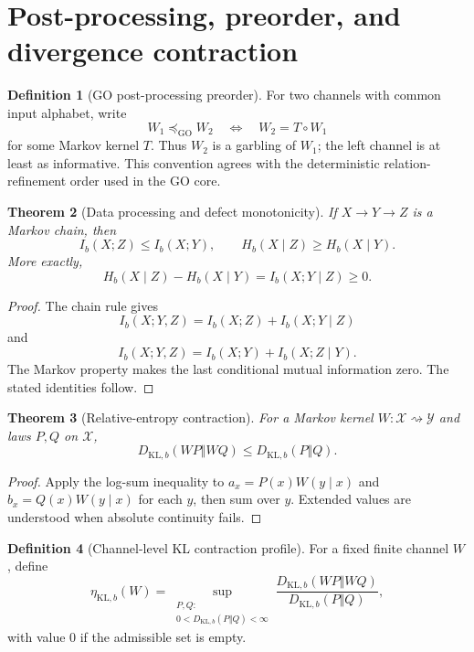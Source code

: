 \documentclass[11pt,a4paper]{article}
\theoremstyle{definition}
\newtheorem{definition}{Definition}[section]
\theoremstyle{plain}
\newtheorem{theorem}[definition]{Theorem}
\theoremstyle{remark}
\newcommand{\X}{\mathcal{X}}
\newcommand{\Y}{\mathcal{Y}}
\newcommand{\1}{\mathbf{1}}
\newcommand{\KLb}{D_{\mathrm{KL},b}}
\newcommand{\Hb}{H_b}
\newcommand{\Ib}{I_b}
\begin{document}
\section{Post-processing, preorder, and divergence contraction}

\begin{definition}[GO post-processing preorder]
For two channels with common input alphabet, write
\[
W_1\preceq_{\mathrm{GO}}W_2
\quad\Longleftrightarrow\quad
W_2=T\circ W_1
\]
for some Markov kernel $T$. Thus $W_2$ is a garbling of $W_1$; the left
channel is at least as informative. This convention agrees with the
deterministic relation-refinement order used in the GO core.
\end{definition}

\begin{theorem}[Data processing and defect monotonicity]
\label{thm:dpi}
If $X\to Y\to Z$ is a Markov chain, then
\[
\Ib(X;Z)\leq\Ib(X;Y),
\qquad
\Hb(X\mid Z)\geq\Hb(X\mid Y).
\]
More exactly,
\[
\Hb(X\mid Z)-\Hb(X\mid Y)=\Ib(X;Y\mid Z)\geq0.
\]
\end{theorem}

\begin{proof}
The chain rule gives
\[
\Ib(X;Y,Z)=\Ib(X;Z)+\Ib(X;Y\mid Z)
\]
and
\[
\Ib(X;Y,Z)=\Ib(X;Y)+\Ib(X;Z\mid Y).
\]
The Markov property makes the last conditional mutual information zero.
The stated identities follow.
\end{proof}

\begin{theorem}[Relative-entropy contraction]
\label{thm:kl-contraction}
For a Markov kernel $W:\X\rightsquigarrow\Y$ and laws $P,Q$ on $\X$,
\[
\KLb(WP\Vert WQ)\leq\KLb(P\Vert Q).
\]
\end{theorem}

\begin{proof}
Apply the log-sum inequality to
$a_x=P(x)W(y\mid x)$ and $b_x=Q(x)W(y\mid x)$ for each $y$, then sum over
$y$. Extended values are understood when absolute continuity fails.
\end{proof}

\begin{definition}[Channel-level KL contraction profile]
For a fixed finite channel $W$, define
\[
\eta_{\mathrm{KL},b}(W)
=
\sup_{\substack{P,Q:\\0<\KLb(P\Vert Q)<\infty}}
\frac{\KLb(WP\Vert WQ)}{\KLb(P\Vert Q)},
\]
with value $0$ if the admissible set is empty.
\end{definition}
\end{document}

